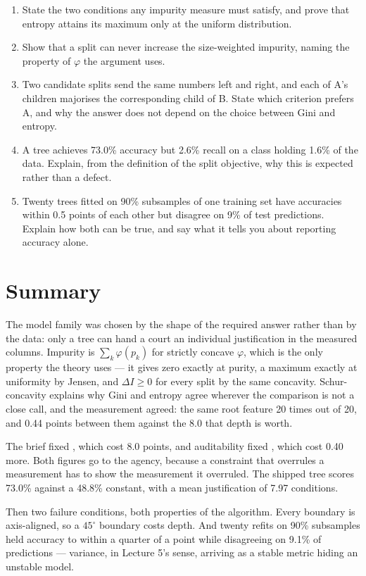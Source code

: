 \documentclass[11pt,a4paper]{article}
\begin{document}
\begin{enumerate}[leftmargin=1.6em,itemsep=4pt]
  \item State the two conditions any impurity measure must satisfy, and prove
        that entropy attains its maximum only at the uniform distribution.
        \hfill \scope{[5]}
  \item Show that a split can never increase the size-weighted impurity, naming
        the property of $\varphi$ the argument uses. \hfill \scope{[4]}
  \item Two candidate splits send the same numbers left and right, and each of
        A's children majorises the corresponding child of B. State which
        criterion prefers A, and why the answer does not depend on the choice
        between Gini and entropy. \hfill \scope{[4]}
  \item A tree achieves 73.0\% accuracy but 2.6\% recall on a class holding
        1.6\% of the data. Explain, from the definition of the split
        objective, why this is expected rather than a defect.
        \hfill \scope{[5]}
  \item Twenty trees fitted on 90\% subsamples of one training set have
        accuracies within 0.5 points of each other but disagree on 9\% of test
        predictions. Explain how both can be true, and say what it tells you
        about reporting accuracy alone. \hfill \scope{[4]}
\end{enumerate}

\section*{Summary}

The model family was chosen by the shape of the required answer rather than by
the data: only a tree can hand a court an individual justification in the
measured columns. Impurity is $\sum_k\varphi(p_k)$ for strictly concave
$\varphi$, which is the only property the theory uses --- it gives zero exactly
at purity, a maximum exactly at uniformity by Jensen, and $\Delta I \ge 0$ for
every split by the same concavity. Schur-concavity explains why Gini and
entropy agree wherever the comparison is not a close call, and the measurement
agreed: the same root feature 20 times out of 20, and 0.44 points between them
against the 8.0 that depth is worth.

The brief fixed , which cost 8.0 points, and auditability
fixed , which cost 0.40 more. Both figures go to
the agency, because a constraint that overrules a measurement has to show the
measurement it overruled. The shipped tree scores 73.0\% against a 48.8\%
constant, with a mean justification of 7.97 conditions.

Then two failure conditions, both properties of the algorithm. Every boundary
is axis-aligned, so a $45^\circ$ boundary costs depth. And twenty refits on
90\% subsamples held accuracy to within a quarter of a point while disagreeing
on 9.1\% of predictions --- variance, in Lecture 5's sense, arriving as a
stable metric hiding an unstable model.
\end{document}
